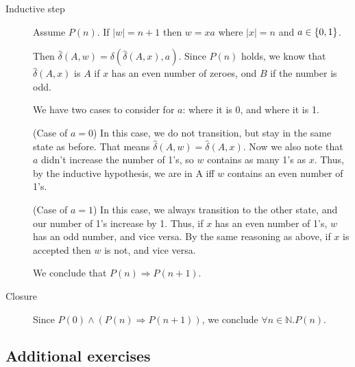 \documentclass{article}
\begin{document}
\begin{enumerate}
\begin{description}
            \item[Inductive step]
                Assume $P(n)$. If $|w| = n + 1$ then $w = xa$ where $|x| = n$ and $a \in \set{0,1}$.

                Then $\hat{\delta}(A, w) = \delta(\hat{\delta}(A, x), a)$. Since $P(n)$ holds, we know that $\hat{\delta}(A,x)$ is $A$ if $x$ has an even number of zeroes, ond $B$ if the number is odd.

                We have two cases to consider for $a$: where it is 0, and where it is 1.

                (Case of $a=0$) In this case, we do not transition, but stay in the same state as before. That means $\hat{\delta}(A, w) = \hat{\delta}(A,x)$. Now we also note that $a$ didn't increase the number of 1's, so $w$ contains as many 1's as $x$. Thus, by the inductive hypothesis, we are in A iff $w$ contains an even number of 1's.

                (Case of $a=1$) In this case, we always transition to the other state, and our number of 1's increase by 1. Thus, if $x$ has an even number of 1's, $w$ has an odd number, and vice versa. By the same reasoning as above, if $x$ is accepted then $w$ is not, and vice versa.

                We conclude that $P(n) \Rightarrow P(n+1)$.
                
            \item[Closure]
                Since $P(0) \land (P(n) \Rightarrow P(n+1))$, we conclude $\forall n \in \mathbb{N}. P(n)$.

        \end{description}

\end{enumerate}

\subsection*{Additional exercises}
\end{document}
